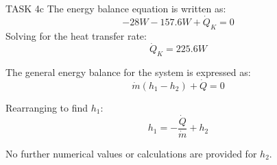 TASK 4c  
The energy balance equation is written as:  
\[
-28W - 157.6W + \dot{Q}_K = 0
\]  
Solving for the heat transfer rate:  
\[
\dot{Q}_K = 225.6W
\]  

The general energy balance for the system is expressed as:  
\[
\dot{m}(h_1 - h_2) + \dot{Q} = 0
\]  

Rearranging to find \( h_1 \):  
\[
h_1 = -\frac{\dot{Q}}{\dot{m}} + h_2
\]  

No further numerical values or calculations are provided for \( h_2 \).